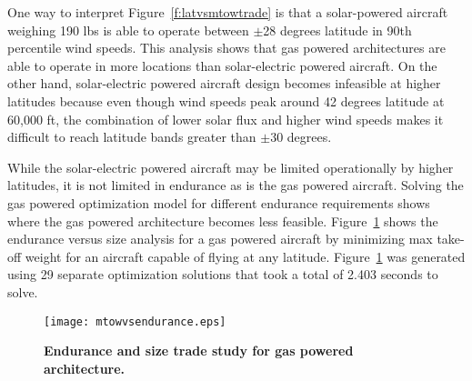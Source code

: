 One way to interpret Figure~\ref{f:latvsmtowtrade} is that a solar-powered aircraft weighing 190 lbs is able to operate between $\pm$28 degrees latitude in 90th percentile wind speeds.  
This analysis shows that gas powered architectures are able to operate in more locations than solar-electric powered aircraft.  
On the other hand, solar-electric powered aircraft design becomes infeasible at higher latitudes because even though wind speeds peak around 42 degrees latitude at 60,000 ft, the combination of lower solar flux and higher wind speeds makes it difficult to reach latitude bands greater than $\pm$30 degrees. 

While the solar-electric powered aircraft may be limited operationally by higher latitudes, it is not limited in endurance as is the gas powered aircraft.
Solving the gas powered optimization model for different endurance requirements shows where the gas powered architecture becomes less feasible. 
Figure~\ref{f:mtowvsendurance} shows the endurance versus size analysis for a gas powered aircraft by minimizing max take-off weight for an aircraft capable of flying at any latitude. 
Figure~\ref{f:mtowvsendurance} was generated using 29 separate optimization solutions that took a total of 2.403 seconds to solve.

\begin{figure}[H]
	\begin{center}
	\texttt{[image: mtowvsendurance.eps]}
    \caption{\textbf{Endurance and size trade study for gas powered architecture.}}
	\label{f:mtowvsendurance}
	\end{center}
\end{figure}

% 

